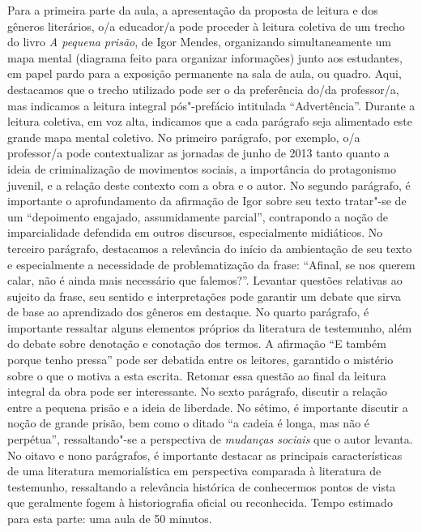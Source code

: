 \documentclass[11pt]{extarticle}
\begin{document}
Para a primeira parte da aula, a apresentação da proposta de leitura e
dos gêneros literários, o/a educador/a pode proceder à leitura coletiva
de um trecho do livro \emph{A pequena prisão}, de Igor Mendes,
organizando simultaneamente um mapa mental (diagrama feito para
organizar informações) junto aos estudantes, em papel pardo para a
exposição permanente na sala de aula, ou quadro. Aqui, destacamos que o
trecho utilizado pode ser o da preferência do/da professor/a, mas
indicamos a leitura integral pós"-prefácio intitulada ``Advertência''.
Durante a leitura coletiva, em voz alta, indicamos que a cada parágrafo
seja alimentado este grande mapa mental coletivo. No primeiro parágrafo,
por exemplo, o/a professor/a pode contextualizar as jornadas de junho de
2013 tanto quanto a ideia de criminalização de movimentos sociais, a
importância do protagonismo juvenil, e a relação deste contexto com a
obra e o autor. No segundo parágrafo, é importante o aprofundamento da
afirmação de Igor sobre seu texto tratar"-se de um ``depoimento engajado,
assumidamente parcial'', contrapondo a noção de imparcialidade defendida
em outros discursos, especialmente midiáticos. No terceiro parágrafo,
destacamos a relevância do início da ambientação de seu texto e
especialmente a necessidade de problematização da frase: ``Afinal, se
nos querem calar, não é ainda mais necessário que falemos?''. Levantar
questões relativas ao sujeito da frase, seu sentido e interpretações
pode garantir um debate que sirva de base ao aprendizado dos gêneros em
destaque. No quarto parágrafo, é importante ressaltar alguns elementos
próprios da literatura de testemunho, além do debate sobre denotação e
conotação dos termos. A afirmação ``E também porque tenho pressa'' pode
ser debatida entre os leitores, garantido o mistério sobre o que o
motiva a esta escrita. Retomar essa questão ao final da leitura integral
da obra pode ser interessante. No sexto parágrafo, discutir a relação
entre a pequena prisão e a ideia de liberdade. No sétimo, é importante
discutir a noção de grande prisão, bem como o ditado ``a cadeia é longa,
mas não é perpétua'', ressaltando"-se a perspectiva de \emph{mudanças
sociais} que o autor levanta. No oitavo e nono parágrafos, é importante
destacar as principais características de uma literatura memorialística
em perspectiva comparada à literatura de testemunho, ressaltando a
relevância histórica de conhecermos pontos de vista que geralmente fogem
à historiografia oficial ou reconhecida. Tempo estimado para esta parte:
uma aula de 50 minutos.
\end{document}
